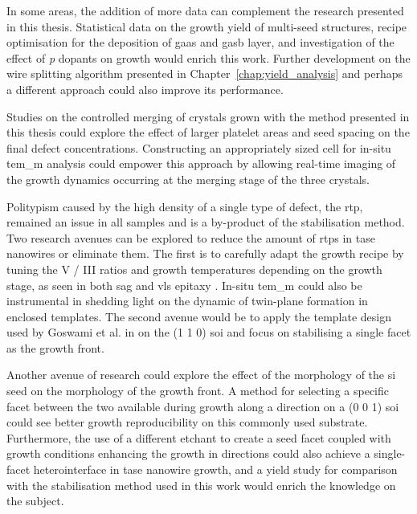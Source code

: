 In some areas, the addition of more data can complement the research presented in this thesis. Statistical data on the growth yield of multi-seed structures, recipe optimisation for the deposition of \acf{gaas} and \acf{gasb} layer, and investigation of the effect of \textit{p} dopants on growth would enrich this work. Further development on the wire splitting algorithm presented in Chapter~\ref{chap:yield_analysis} and perhaps a different approach could also improve its performance. 

Studies on the controlled merging of crystals grown with the method presented in this thesis could explore the effect of larger platelet areas and seed spacing on the final defect concentrations. Constructing an appropriately sized cell for in-situ \acf{tem_m} analysis could empower this approach by allowing real-time imaging of the growth dynamics occurring at the merging stage of the three crystals.

Politypism caused by the high density of a single type of defect, the \acf{rtp}, remained an issue in all samples and is a by-product of the  stabilisation method. Two research avenues can be explored to reduce the amount of \acs{rtp}s in \acs{tase} nanowires or eliminate them. The first is to carefully adapt the growth recipe by tuning the V / III ratios and growth temperatures depending on the growth stage, as seen in both \acf{sag} \cite{Chi2013} and \acf{vls} epitaxy \cite{Joyce2007}. In-situ \acs{tem_m} could also be instrumental in shedding light on the dynamic of twin-plane formation in enclosed templates. The second avenue would be to apply the template design used by Goswami et al. in \cite{Goswami2020} on the \hkl(1 1 0) \acs{soi} and focus on stabilising a single  facet as the growth front.

Another avenue of research could explore the effect of the morphology of the \acl{si} seed on the morphology of the growth front. A method for selecting a specific  facet between the two available during growth along a  direction on a \hkl(0 0 1) \acs{soi} could see better growth reproducibility on this commonly used substrate. Furthermore, the use of a different etchant to create a  seed facet coupled with growth conditions enhancing the growth in  directions could also achieve a single-facet heterointerface in \acs{tase} nanowire growth, and a yield study for comparison with the  stabilisation method used in this work would enrich the knowledge on the subject.

